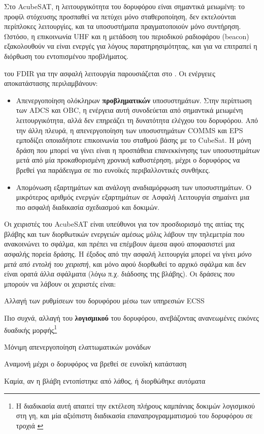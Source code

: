 \documentclass[a4paper,nobib]{tufte-book}
\begin{document}
Στο AcubeSAT, η λειτουργικότητα του δορυφόρου είναι σημαντικά μειωμένη: το προφίλ στόχευσης προσπαθεί να πετύχει μόνο σταθεροποίηση, δεν εκτελούνται περίπλοκες λειτουργίες, και τα υποσυστήματα πραγματοποιούν μόνο συντήρηση. Ωστόσο, η επικοινωνία \ac{UHF} και η μετάδοση του περιοδικού ραδιοφάρου (beacon) εξακολουθούν να είναι ενεργές για λόγους παρατηρησιμότητας, και για να επιτραπεί η διόρθωση του εντοπισμένου προβλήματος.

 του \acs{FDIR} για την ασφαλή λειτουργία παρουσιάζεται στο . Οι ενέργειες αποκατάστασης περιλαμβάνουν:
\begin{itemize}
	\item Απενεργοποίηση ολόκληρων \textbf{προβληματικών} υποσυστημάτων. Στην περίπτωση των \acs{ADCS} και \acs{OBC}, η ενέργεια αυτή συνοδεύεται από σημαντικά μειωμένη λειτουργικότητα, αλλά δεν επηρεάζει τη δυνατότητα ελέγχου του δορυφόρου. Από την άλλη πλευρά, η απενεργοποίηση των υποσυστημάτων \acs{COMMS} και \acs{EPS} εμποδίζει οποιαδήποτε επικοινωνία του σταθμού βάσης με το CubeSat. Η μόνη δράση που μπορεί να γίνει είναι η προσπάθεια επανεκκίνησης των υποσυστημάτων μετά από μία προκαθορισμένη χρονική καθυστέρηση, μέχρι ο δορυφόρος να βρεθεί για παράδειγμα σε πιο ευνοϊκές περιβαλλοντικές συνθήκες.
	\item Απομόνωση εξαρτημάτων και ανάλογη αναδιαμόρφωση των υποσυστημάτων. Ο μικρότερος αριθμός ενεργών εξαρτημάτων σε Ασφαλή Λειτουργία σημαίνει μια πιο ασφαλή διαδικασία σχεδιασμού και δοκιμών.
\end{itemize}


Οι χειριστές του AcubeSAT είναι υπεύθυνοι για τον προσδιορισμό της αιτίας της βλάβης και των διορθωτικών ενεργειών αμέσως μόλις λάβουν την τηλεμετρία που ανακοινώνει το σφάλμα, και πρέπει να επέμβουν άμεσα αφού αποφασιστεί μια ασφαλής πορεία δράσης. Η έξοδος από την ασφαλή λειτουργία μπορεί να γίνει \emph{μόνο μετά από εντολή του χειριστή}, και μόνο αφού διορθωθεί το αρχικό σφάλμα και δεν είναι ορατά άλλα σφάλματα (λόγω π.χ. διάδοσης της βλάβης). Οι δράσεις που μπορούν να λάβουν οι χειριστές είναι:
\begin{compactitem}
	\item Αλλαγή των ρυθμίσεων του δορυφόρου μέσω των υπηρεσιών \acs{ECSS}
	\item Πιο συχνά, αλλαγή του \textbf{λογισμικού} του δορυφόρου, ανεβάζοντας ανανεωμένες εικόνες δυαδικής μορφής\footnote{Η διαδικασία αυτή απαιτεί την εκτέλεση πλήρους καμπάνιας δοκιμών λογισμικού στη γη, και μία αξιόπιστη διαδικασία επαναπρογραμματισμού του δορυφόρου σε τροχιά \parencite[45]{DDJF_OBSW}}
	\item Μόνιμη απενεργοποίηση ελαττωματικών μονάδων
	\item Αναμονή μέχρι ο δορυφόρος να βρεθεί σε ευνοϊκή κατάσταση
	\item Καμία, αν η βλάβη εντοπίστηκε από λάθος, ή διορθώθηκε αυτόματα
\end{compactitem}
\end{document}
